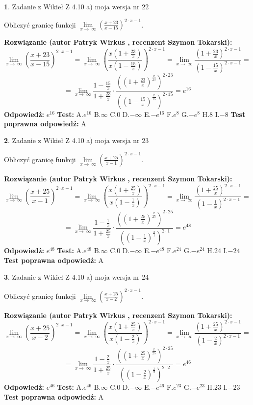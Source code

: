 \documentclass[12pt, a4paper]{article}
\theoremstyle{definition} %
\newtheorem{zad}{}
\newcommand{\zadStart}[1]{\begin{zad}#1\newline}
\newcommand{\zadStop}{\end{zad}}
\newcommand{\rozwStart}[2]{\noindent \textbf{Rozwiązanie (autor #1 , recenzent #2): }\newline}
\newcommand{\rozwStop}{\newline}
\newcommand{\odpStart}{\noindent \textbf{Odpowiedź:}\newline}
\newcommand{\odpStop}{\newline}
\newcommand{\testStart}{\noindent \textbf{Test:}\newline}
\newcommand{\testStop}{\newline}
\newcommand{\kluczStart}{\noindent \textbf{Test poprawna odpowiedź:}\newline}
\newcommand{\kluczStop}{\newline}
\begin{document}
\zadStart{Zadanie z Wikieł Z 4.10 a) moja wersja nr 22}

Obliczyć granicę funkcji  $\lim\limits_{x\to\ \infty}(\frac{x+23}{x-15})^{2\cdot x-1}$.
\zadStop
\rozwStart{Patryk Wirkus}{Szymon Tokarski}
$$\lim\limits_{x\to\ \infty}(\frac{x+23}{x-15})^{2\cdot x-1} = \lim\limits_{x\to\ \infty}(\frac{x(1+\frac{23}{x})}{x(1-\frac{15}{x})})^{2\cdot x-1}=\lim\limits_{x\to\ \infty}\frac{(1+\frac{23}{x})^{2\cdot x-1}}{(1-\frac{15}{x})^{2\cdot x-1}}=$$
$$=\lim\limits_{x\to\ \infty}\frac{1-\frac{15}{x}}{1+\frac{23}{x}}\cdot\frac{((1+\frac{23}{x})^{\frac{x}{23}})^{2\cdot23}}{((1-\frac{15}{x})^{\frac{x}{15}})^{2\cdot15}}=e^{16}$$
\rozwStop
\odpStart
$e^{16}$
\odpStop
\testStart
A.$e^{16}$ B.$\infty$ C.$0$ D.$-\infty$ E.$-e^{16}$
F.$e^{8}$ G.$-e^{8}$
H.$8$
I.$-8$
\testStop
\kluczStart
A
\kluczStop



\zadStart{Zadanie z Wikieł Z 4.10 a) moja wersja nr 23}

Obliczyć granicę funkcji  $\lim\limits_{x\to\ \infty}(\frac{x+25}{x-1})^{2\cdot x-1}$.
\zadStop
\rozwStart{Patryk Wirkus}{Szymon Tokarski}
$$\lim\limits_{x\to\ \infty}(\frac{x+25}{x-1})^{2\cdot x-1} = \lim\limits_{x\to\ \infty}(\frac{x(1+\frac{25}{x})}{x(1-\frac{1}{x})})^{2\cdot x-1}=\lim\limits_{x\to\ \infty}\frac{(1+\frac{25}{x})^{2\cdot x-1}}{(1-\frac{1}{x})^{2\cdot x-1}}=$$
$$=\lim\limits_{x\to\ \infty}\frac{1-\frac{1}{x}}{1+\frac{25}{x}}\cdot\frac{((1+\frac{25}{x})^{\frac{x}{25}})^{2\cdot25}}{((1-\frac{1}{x})^{\frac{x}{1}})^{2\cdot1}}=e^{48}$$
\rozwStop
\odpStart
$e^{48}$
\odpStop
\testStart
A.$e^{48}$ B.$\infty$ C.$0$ D.$-\infty$ E.$-e^{48}$
F.$e^{24}$ G.$-e^{24}$
H.$24$
I.$-24$
\testStop
\kluczStart
A
\kluczStop



\zadStart{Zadanie z Wikieł Z 4.10 a) moja wersja nr 24}

Obliczyć granicę funkcji  $\lim\limits_{x\to\ \infty}(\frac{x+25}{x-2})^{2\cdot x-1}$.
\zadStop
\rozwStart{Patryk Wirkus}{Szymon Tokarski}
$$\lim\limits_{x\to\ \infty}(\frac{x+25}{x-2})^{2\cdot x-1} = \lim\limits_{x\to\ \infty}(\frac{x(1+\frac{25}{x})}{x(1-\frac{2}{x})})^{2\cdot x-1}=\lim\limits_{x\to\ \infty}\frac{(1+\frac{25}{x})^{2\cdot x-1}}{(1-\frac{2}{x})^{2\cdot x-1}}=$$
$$=\lim\limits_{x\to\ \infty}\frac{1-\frac{2}{x}}{1+\frac{25}{x}}\cdot\frac{((1+\frac{25}{x})^{\frac{x}{25}})^{2\cdot25}}{((1-\frac{2}{x})^{\frac{x}{2}})^{2\cdot2}}=e^{46}$$
\rozwStop
\odpStart
$e^{46}$
\odpStop
\testStart
A.$e^{46}$ B.$\infty$ C.$0$ D.$-\infty$ E.$-e^{46}$
F.$e^{23}$ G.$-e^{23}$
H.$23$
I.$-23$
\testStop
\kluczStart
A
\kluczStop
\end{document}
